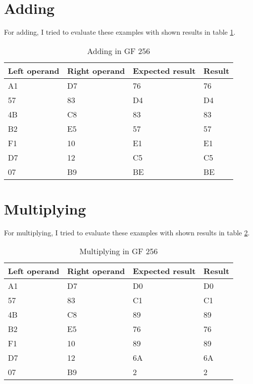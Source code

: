 \documentclass[5pt]{article}
\begin{document}
\maketitle

\section{Adding}
For adding, I tried to evaluate these examples with shown results in
table \ref{tab:adding}.

\begin{table}[ht]
  \centering
  \caption{Adding in GF 256}
  \begin{tabular}{|l|l|l|l|}
  \hline
  Left operand & Right operand & Expected result & Result\\
  \hline
  \hline
  
  A1 & D7 & 76 & 76 \\
  \hline
57 & 83 & D4 & D4\\
\hline
4B & C8 & 83 & 83\\
\hline
B2 & E5 & 57 & 57 \\
\hline
F1 & 10 &  E1 & E1\\
\hline 	
D7 & 12 & C5 & C5 \\
\hline 	
07& B9 & BE &	BE\\
\hline

  \end{tabular}
  \label{tab:adding}
\end{table}


\section{Multiplying}
For multiplying, I tried to evaluate these examples with shown results in
table \ref{tab:multiplying}.

\begin{table}[ht]
  \centering
  \caption{Multiplying in GF 256}
  \begin{tabular}{|l|l|l|l|}
  \hline
  Left operand & Right operand & Expected result & Result\\
  \hline
  \hline
  
  A1 & D7 & D0 & D0 \\
  \hline
57 & 83 & C1 & C1\\
\hline
4B & C8 & 89 & 89\\
\hline
B2 & E5 & 76 & 76 \\
\hline
F1 & 10 &  89 & 89\\
\hline 	
D7 & 12 & 6A & 6A \\
\hline 	
07& B9 & 2 &	2\\
\hline

  \end{tabular}
  \label{tab:multiplying}
\end{table}
\end{document}
